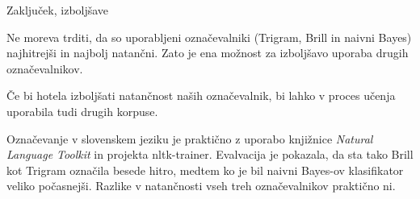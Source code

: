 \documentclass{beamer}
\begin{document}
\begin{frame}{Zaključek, izboljšave}

Ne moreva trditi, da so uporabljeni označevalniki (Trigram, Brill in naivni Bayes) najhitrejši in najbolj natančni. Zato je ena možnost za izboljšavo uporaba drugih označevalnikov. 
\par
Če bi hotela izboljšati natančnost naših označevalnik, bi lahko v proces učenja uporabila tudi drugih korpuse. 

\par
Označevanje v slovenskem jeziku je praktično z uporabo knjižnice \textit{Natural Language Toolkit} in projekta nltk-trainer. Evalvacija je pokazala, da sta tako Brill kot Trigram označila besede hitro, medtem ko je bil naivni Bayes-ov klasifikator veliko počasnejši. Razlike v natančnosti vseh treh označevalnikov praktično ni.
\end{frame}
\end{document}
